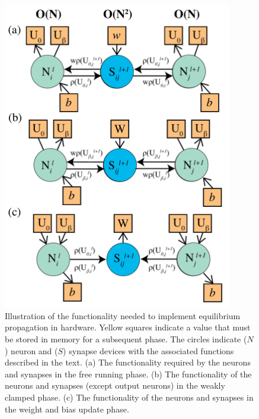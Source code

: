 \documentclass[utf8]{frontiersSCNS}
\begin{document}
\begin{figure}[h!]
\begin{center}
\includegraphics[width=10cm]{figures/eq_prop_sb.pdf}
\end{center}
\caption{Illustration of the functionality needed to implement equilibrium propagation in hardware. Yellow squares indicate a value that must be stored in memory for a subsequent phase. The circles indicate ($N$) neuron and ($S$) synapse devices with the associated functions described in the text. (a) The functionality required by the neurons and synapses in the free running phase. (b) The functionality of the neurons and synapses (except output neurons) in the weakly clamped phase. (c) The functionality of the neurons and synapses in the weight and bias update phase.} \label{fig:eq_prop}
\end{figure}
\end{document}
